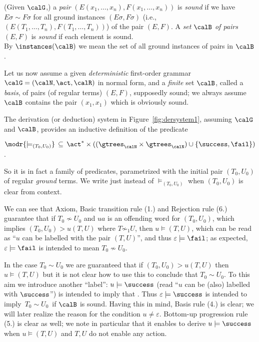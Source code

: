 \documentclass[12pt]{article}
\begin{document}
\begin{defn}
(Given $\calG$,)
a \emph{pair}
$(E(x_1,\dots,x_n),F(x_1,\dots,x_n))$ is \emph{sound} if we
have  $E\sigma\sim F\sigma$ 
for all ground instances 
$(E\sigma,F\sigma)$ (i.e., $(E(T_1,\dots,T_n),F(T_1,\dots,T_n))$) 
of the pair $(E,F)$.
A \emph{set} $\calB$ \emph{of pairs} $(E,F)$ is \emph{sound} if each
element is sound. 
\\
By $\instances(\calB)$ we mean the set of all
ground instances of pairs in $\calB$.
\end{defn}
Let us now assume a given \emph{deterministic}
first-order grammar 
 $\calG=(\calN,\act,\calR)$ in normal form, and
a \emph{finite} set $\calB$, called
a \emph{basis}, 
of pairs (of regular terms) $(E,F)$, supposedly sound;
we 
always 
assume $\calB$ contains the pair $(x_1,x_1)$
which is obviously sound.


The derivation (or deduction) system in
Figure~\ref{fig:dersystem1}, assuming $\calG$ and $\calB$,
provides
an inductive definition of the predicate 
\begin{center}
$\modr{\models_{(T_0,U_0)}}\,\subseteq\, \act^*\times
((\gtrees_{\calN}\times \gtrees_{\calN})\cup\{\success,\fail\})$.
\end{center}
So it is in fact a family of predicates, parametrized with the initial
pair $(T_0,U_0)$ of regular \emph{ground} terms. We write just
\modr{$\models$} instead of 
$\models_{(T_0,U_0)}$ when $(T_0,U_0)$ is  clear from context. 


We can see that Axiom,
Basic transition rule (1.) and Rejection rule (6.) guarantee that 
if $T_0\not\sim U_0$ and $ua$ is an offending word for 
$(T_0,U_0)$, which implies $(T_0,U_0)\gt{u}(T,U)$ where $T\not\sim_1 U$,
then  $u\models (T,U)$, which can be read as ``$u$ can be labelled
with the pair $(T,U)$'', and thus $\varepsilon \models \fail$; as
expected, 
 $\varepsilon \models \fail$ is intended to mean $T_0\not\sim U_0$.
 
In the case  $T_0\sim U_0$  we are guaranteed that 
if $(T_0,U_0)\gt{u}(T,U)$ then $u\models (T,U)$ but it is not clear
how to use this to conclude that $T_0\sim U_0$.
To this aim we introduce another ``label'': 
$u\models \success$ 
(read ``$u$ can be (also) labelled with $\success$'')
is intended
to imply
that 
. Thus $\varepsilon\models\success$ 
is intended to imply
\,$T_0\sim U_0$\, if $\calB$ is sound.
Having this in mind, Basis rule (4.) is clear;
 we will later
realize the reason for the condition $u\neq \varepsilon$.
Bottom-up progression rule (5.) is clear as well;
we note in particular that it enables 
to derive
$u\models \success$ when $u\models (T,U)$ and
$T,U$ do not enable any action. 
\end{document}

